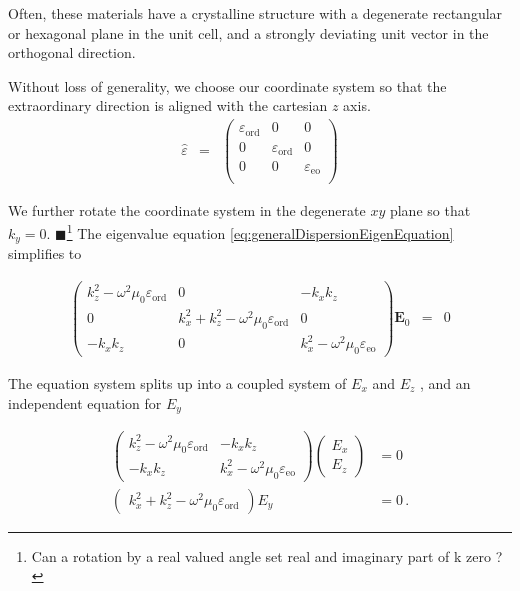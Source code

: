 \documentclass[12pt,a4paper,twoside,openright,BCOR10mm,headsepline,titlepage,abstracton,chapterprefix,final]{scrreprt}
\newcommand\Vector[1]{{\mathbf{#1}}}
\newcommand\vacuum{0}
\newcommand\wavenumber{k}
\newcommand\Tensor[1]{\hat{#1}}
\newcommand\scalarEfield{E}
\newcommand\Efield{\Vector{\scalarEfield}}
\newcommand\vacuumpermeability{\scalarpermeability_{\vacuum}}
\newcommand\scalarpermeability{\mu}
\newcommand\permittivity{\Tensor{\scalarpermittivity}}
\newcommand\scalarpermittivity{\varepsilon}
\newcommand\ordi{\text{ord}}
\newcommand\eo{\text{eo}}
\newcommand{\remark}[1]{{\color{red}$\blacksquare$}\footnote{{\color{red}#1}}}
\begin{document}
Often, these materials have a crystalline structure with a degenerate rectangular or hexagonal plane in the unit cell, 
and a strongly deviating unit vector in the orthogonal direction. 

Without loss of generality, we choose our coordinate system so that the extraordinary direction is aligned with the cartesian $z$ axis.
\begin{eqnarray}
 \permittivity &=&
 \begin{pmatrix}
  \scalarpermittivity_{\ordi}  & 0 & 0 \\
  0 & \scalarpermittivity_{\ordi}  & 0 \\
  0 & 0 & \scalarpermittivity_{\eo}   \\
 \end{pmatrix}
\end{eqnarray}

We further rotate the coordinate system in the degenerate $xy$ plane so that $\wavenumber_y = 0$.
\remark{Can a rotation by a real valued angle set real and imaginary part of k zero ?}
The eigenvalue equation \ref{eq:generalDispersionEigenEquation} simplifies to

\begin{eqnarray}
\begin{pmatrix}
 \wavenumber_z^2 - \omega^2 \vacuumpermeability \scalarpermittivity_{\ordi} 
 &
 0
 &
 - \wavenumber_x \wavenumber_z 
 \\
 0
 &
 \wavenumber_x^2 + \wavenumber_z^2 - \omega^2 \vacuumpermeability \scalarpermittivity_{\ordi} 
 &
 0 
 \\
 - \wavenumber_x \wavenumber_z 
 &
 0 
 &
 \wavenumber_x^2 - \omega^2 \vacuumpermeability \scalarpermittivity_{\eo}  
\end{pmatrix}
\Efield_0
&=& 0
\end{eqnarray}

The equation system splits up into a coupled system of $\scalarEfield_x$ and $\scalarEfield_z$ , and an independent equation for $\scalarEfield_y$

\begin{subequations}
\begin{align}
\begin{pmatrix}
 \wavenumber_z^2 - \omega^2 \vacuumpermeability \scalarpermittivity_{\ordi} 
 &
 - \wavenumber_x \wavenumber_z 
 \\
 - \wavenumber_x \wavenumber_z 
 &
 \wavenumber_x^2 - \omega^2 \vacuumpermeability \scalarpermittivity_{\eo}  
\end{pmatrix} 
\begin{pmatrix}
 \scalarEfield_x 
 \\
 \scalarEfield_z
\end{pmatrix}
&= 0
\\
\begin{pmatrix} \wavenumber_x^2 + \wavenumber_z^2 - \omega^2 \vacuumpermeability \scalarpermittivity_{\ordi} \end{pmatrix} \scalarEfield_y &= 0\,.
\end{align}
\end{subequations}
\end{document}
